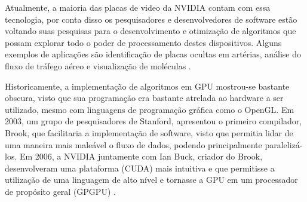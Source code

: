 Atualmente, a maioria das placas de video da NVIDIA contam com essa tecnologia, por conta disso os pesquisadores e desenvolvedores de software estão voltando suas pesquisas para o desenvolvimento e otimização de algoritmos que possam explorar todo o poder de processamento destes dispositivos. Alguns exemplos de aplicações são identificação de placas ocultas em artérias, análise do fluxo de tráfego aéreo \cite{Monish2011} e visualização de moléculas \cite{Stone2015}.

Historicamente, a implementação de algoritmos em GPU mostrou-se bastante obscura, visto que sua programação era bastante atrelada ao hardware a ser utilizado, mesmo com linguagens de programação gráfica como o OpenGL. Em 2003, um grupo de pesquisadores de Stanford, apresentou o primeiro compilador, Brook, que facilitaria a implementação de software, visto que permitia lidar de uma maneira mais maleável o fluxo de dados, podendo principalmente paralelizá-los. Em 2006, a NVIDIA juntamente com Ian Buck, criador do Brook, desenvolveram uma plataforma (CUDA) mais intuitiva e que permitisse a utilização de uma linguagem de alto nível e tornasse a GPU em um processador de propósito geral (GPGPU) \cite{NVIDIA}.
